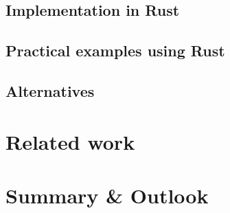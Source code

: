 \documentclass[sigplan,11pt,nonacm]{acmart}
\begin{document}
\cite{ownership-types-survey}

\subsection{Implementation in Rust}


\subsection{Practical examples using Rust}


\subsection{Alternatives}


\section{Related work}
\label{sec:relatedwork}


\section{Summary \& Outlook}
\label{sec:summary}




\end{document}
